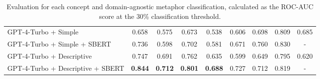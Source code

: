 \begin{table*}[htbp!]
{\begin{tabular}{@{}lcccccccc@{}}
GPT-4-Turbo + Simple              & 0.658          & 0.575          & 0.673          & 0.538          & 0.606          & 0.698          & 0.809          & 0.685          \\
GPT-4-Turbo + Simple + SBERT      & 0.736          & 0.598          & 0.702          & 0.581          & 0.671          & 0.760          & 0.830          & -              \\
GPT-4-Turbo + Descriptive         & 0.747          & 0.691          & 0.762          & 0.635          & 0.599          & 0.649          & 0.795          & 0.620          \\
GPT-4-Turbo + Descriptive + SBERT & \textbf{0.844} & \textbf{0.712} & \textbf{0.801} & \textbf{0.688} & 0.727          & 0.712          & 0.819          & -              \\ \bottomrule
\end{tabular}%
}
\caption{Evaluation for each concept and domain-agnostic metaphor classification, calculated as the ROC-AUC score at the 30\% classification threshold.}
\label{tab:auc30_concepts}
\end{table*}